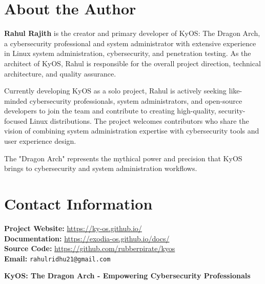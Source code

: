 \documentclass[12pt,a4paper]{article}
\begin{document}
\newpage

\section*{About the Author}

\textbf{Rahul Rajith} is the creator and primary developer of KyOS: The Dragon Arch, a cybersecurity professional and system administrator with extensive experience in Linux system administration, cybersecurity, and penetration testing. As the architect of KyOS, Rahul is responsible for the overall project direction, technical architecture, and quality assurance.

Currently developing KyOS as a solo project, Rahul is actively seeking like-minded cybersecurity professionals, system administrators, and open-source developers to join the team and contribute to creating high-quality, security-focused Linux distributions. The project welcomes contributors who share the vision of combining system administration expertise with cybersecurity tools and user experience design.

The "Dragon Arch" represents the mythical power and precision that KyOS brings to cybersecurity and system administration workflows.

\section*{Contact Information}

\textbf{Project Website:} \url{https://ky-os.github.io/}\\
\textbf{Documentation:} \url{https://exodia-os.github.io/docs/}\\
\textbf{Source Code:} \url{https://github.com/rubberpirate/kyos}\\
\textbf{Email:} \texttt{rahulridhu21@gmail.com}

\vfill
\centering
\textcolor{kyosblue}{\textbf{KyOS: The Dragon Arch - Empowering Cybersecurity Professionals}}
\end{document}
